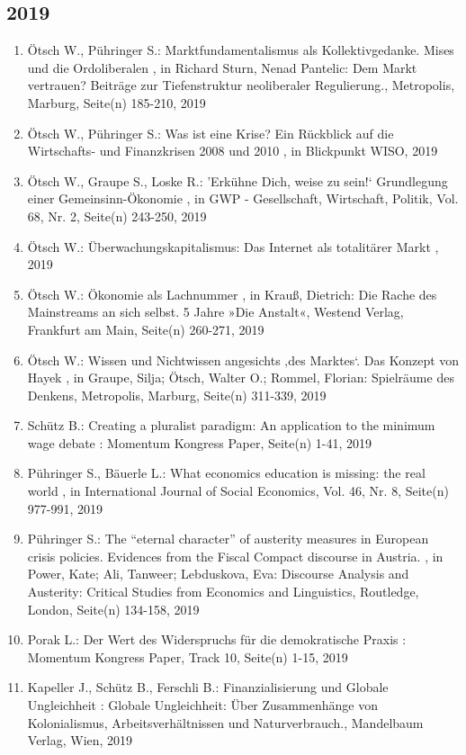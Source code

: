  \subsection*{2019} 
 \begin{enumerate}[leftmargin=*, labelsep=0.5cm] 
	 \item Ötsch W., Pühringer S.:  Marktfundamentalismus als Kollektivgedanke. Mises und die Ordoliberalen  , in Richard Sturn, Nenad Pantelic: Dem Markt vertrauen? Beiträge zur Tiefenstruktur neoliberaler Regulierung., Metropolis, Marburg, Seite(n) 185-210, 2019
	 \item Ötsch W., Pühringer S.:  Was ist eine Krise? Ein Rückblick auf die Wirtschafts- und Finanzkrisen 2008 und 2010  , in Blickpunkt WISO, 2019
	 \item Ötsch W., Graupe S., Loske R.:  ’Erkühne Dich, weise zu sein!‘ Grundlegung einer Gemeinsinn-Ökonomie  , in GWP - Gesellschaft, Wirtschaft, Politik, Vol. 68, Nr. 2, Seite(n) 243-250, 2019
	 \item Ötsch W.:  Überwachungskapitalismus: Das Internet als totalitärer Markt  , 2019
	 \item Ötsch W.:  Ökonomie als Lachnummer  , in Krauß, Dietrich: Die Rache des Mainstreams an sich selbst. 5 Jahre »Die Anstalt«, Westend Verlag, Frankfurt am Main, Seite(n) 260-271, 2019
	 \item Ötsch W.:  Wissen und Nichtwissen angesichts ‚des Marktes‘. Das Konzept von Hayek  , in Graupe, Silja; Ötsch, Walter O.; Rommel, Florian: Spielräume des Denkens, Metropolis, Marburg, Seite(n) 311-339, 2019
	 \item Schütz B.:  Creating a pluralist paradigm: An application to the minimum wage debate  : Momentum Kongress Paper, Seite(n) 1-41, 2019
	 \item Pühringer S., Bäuerle L.:  What economics education is missing: the real world  , in International Journal of Social Economics, Vol. 46, Nr. 8, Seite(n) 977-991, 2019
	 \item Pühringer S.:  The “eternal character” of austerity measures in European crisis policies. Evidences from the Fiscal Compact discourse in Austria.  , in Power, Kate; Ali, Tanweer; Lebduskova, Eva: Discourse Analysis and Austerity: Critical Studies from Economics and Linguistics, Routledge, London, Seite(n) 134-158, 2019
	 \item Porak L.:  Der Wert des Widerspruchs für die demokratische Praxis  : Momentum Kongress Paper, Track 10, Seite(n) 1-15, 2019
	 \item Kapeller J., Schütz B., Ferschli B.:  Finanzialisierung und Globale Ungleichheit  : Globale Ungleichheit: Über Zusammenhänge von Kolonialismus, Arbeitsverhältnissen und Naturverbrauch., Mandelbaum Verlag, Wien, 2019

\end{enumerate}
